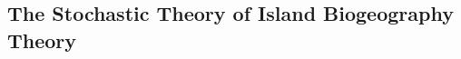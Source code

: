 \documentclass{article}
\begin{document}
\subsection{The Stochastic Theory of Island Biogeography Theory}




\end{document}
